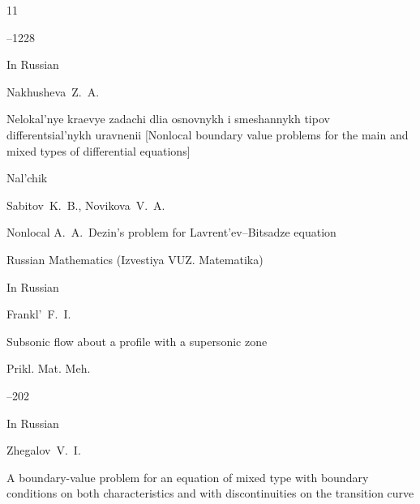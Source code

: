 \begin{thebibliography}{11}


--1228









\lang In Russian

\by Nakhusheva~Z.~A.

\paper Nelokal'nye kraevye zadachi dlia osnovnykh i smeshannykh tipov differentsial'nykh uravnenii \rm [Nonlocal boundary value problems for the main and mixed types of differential equations]

\publaddr Nal'chik






\by Sabitov~K.~B., Novikova~V.~A.

\paper Nonlocal A.~A.~Dezin's problem for Lavrent'ev--Bitsadze equation

\jour Russian Mathematics (Izvestiya VUZ. Matematika)




\toappear








\lang In Russian

\by Frankl'~F.~I.

\paper Subsonic flow about a profile with a supersonic zone

\jour Prikl. Mat. Meh.




–202






\lang In Russian

\by Zhegalov~V.~I.

\paper A boundary-value problem for an equation of mixed type with boundary conditions on both characteristics and with discontinuities on the transition curve


\end{thebibliography}
